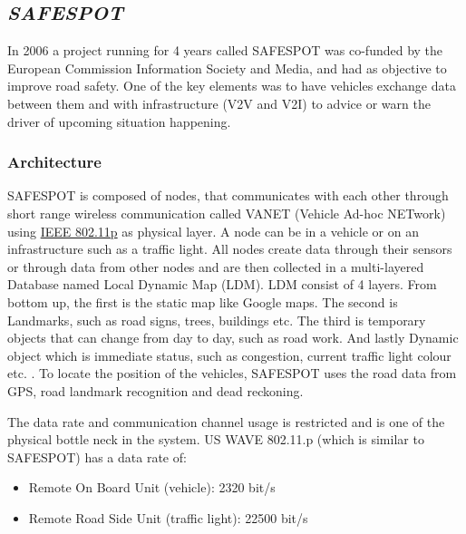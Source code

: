 \subsection{\textit{SAFESPOT}}
In 2006 a project running for 4 years called SAFESPOT \cite{Safespot} was co-funded by the European Commission Information Society and Media, and had as objective to improve road safety. One of the key elements was to have vehicles exchange data between them and with infrastructure (V2V and V2I) to advice or warn the driver of upcoming situation happening.\par
% 
\subsubsection{Architecture}
SAFESPOT is composed of nodes, that communicates with each other through short range wireless communication called VANET (Vehicle Ad-hoc NETwork) using \hyperref[sec:802.11p]{IEEE 802.11p} as physical layer. A node can be in a vehicle or on an infrastructure such as a traffic light. All nodes create data through their sensors or through data from other nodes and are then collected in a multi-layered Database named Local Dynamic Map (LDM).
LDM consist of 4 layers. From bottom up, the first is the static map like Google maps. The second is Landmarks, such as road signs, trees, buildings etc. The third is temporary objects that can change from day to day, such as road work. And lastly Dynamic object which is immediate status, such as congestion, current traffic light colour etc. \cite{Brignolo2008UseProject}.
To locate the position of the vehicles, SAFESPOT uses the road data from GPS, road landmark recognition and dead reckoning\footnotemark.\par
%
% 
% 
% 
The data rate and communication channel usage is restricted and is one of the physical bottle neck in the system. US WAVE 802.11.p (which is similar to SAFESPOT) has a data rate of:
\begin{itemize}[noitemsep]
    \item Remote On Board Unit (vehicle): 2320 bit/s
    \item Remote Road Side Unit (traffic light): 22500 bit/s  
\end{itemize}

